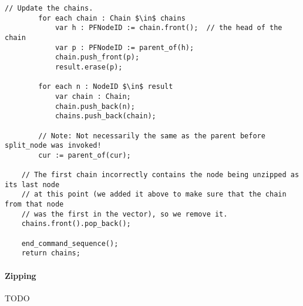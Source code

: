 \begin{stulisting}[p]
\begin{lstlisting}[style=Default]
		// Update the chains.
		for each chain : Chain $\in$ chains
			var h : PFNodeID := chain.front();	// the head of the chain
			var p : PFNodeID := parent_of(h);
			chain.push_front(p);
			result.erase(p);

		for each n : NodeID $\in$ result
			var chain : Chain;
			chain.push_back(n);
			chains.push_back(chain);

		// Note: Not necessarily the same as the parent before split_node was invoked!
		cur := parent_of(cur);

	// The first chain incorrectly contains the node being unzipped as its last node
	// at this point (we added it above to make sure that the chain from that node
	// was the first in the vector), so we remove it.
	chains.front().pop_back();

	end_command_sequence();
	return chains;
\end{lstlisting}
\end{stulisting}

\paragraph{Zipping}

TODO

